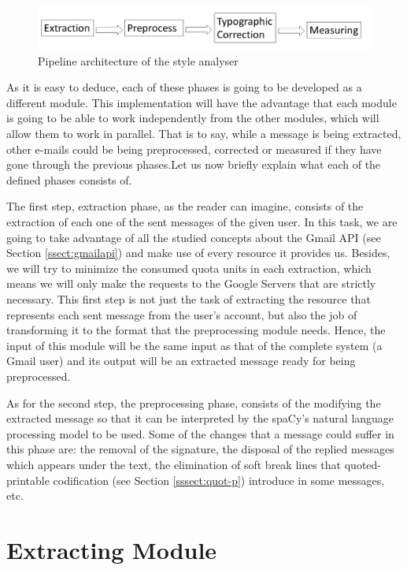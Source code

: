 \begin{figure}[h]
	\centering%
	\includegraphics[width = 1\textwidth]{Imagenes/Bitmap/architecture.png}%
	\caption{Pipeline architecture of the style analyser}%
	\label{fig:arch}
\end{figure}

As it is easy to deduce, each of these phases is going to be developed as a different module. This implementation will have the advantage that each module is going to be able to work independently from the other modules, which will allow them to work in parallel. That is to say, while a message is being extracted, other e-mails could be being preprocessed, corrected or measured if they have gone through the previous phases.Let us now briefly explain what each of the defined phases consists of.

The first step, extraction phase, as the reader can imagine, consists of the extraction of each one of the sent messages of the given user. In this task, we are going to take advantage of all the studied concepts about the Gmail API (see Section \ref{ssect:gmailapi}) and make use of every resource it provides us. Besides, we will try to minimize the consumed quota units in each extraction, which means we will only make the requests to the Google Servers that are strictly necessary. This first step is not just the task of extracting the resource that represents each sent message from the user's account, but also the job of transforming it to the format that the preprocessing module needs. Hence, the input of this module will be the same input as that of the complete system (a Gmail user) and its output will be an extracted message ready for being preprocessed.

As for the second step, the preprocessing phase, consists of the modifying the extracted message so that it can be interpreted by the spaCy's natural language processing model to be used. Some of the changes that a message could suffer in this phase are: the removal of the signature, the disposal of the replied messages which appears under the text, the elimination of soft break lines that quoted-printable codification (see Section \ref{sssect:quot-p}) introduce in some messages, etc.

\section{Extracting Module} \label{ssection:extmod}

